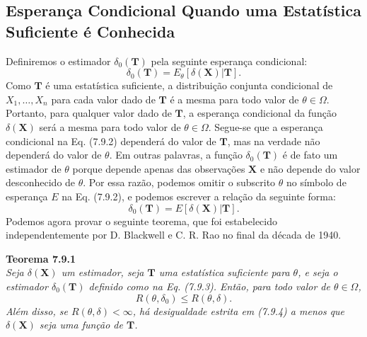 \subsection*{Esperança Condicional Quando uma Estatística Suficiente é Conhecida}

Definiremos o estimador $\delta_0(\mathbf{T})$ pela seguinte esperança condicional:
\begin{equation}
\delta_0(\mathbf{T}) = E_\theta[\delta(\mathbf{X})|\mathbf{T}]. \tag{7.9.2}
\end{equation}
Como $\mathbf{T}$ é uma estatística suficiente, a distribuição conjunta condicional de $X_1, \dots, X_n$ para cada valor dado de $\mathbf{T}$ é a mesma para todo valor de $\theta \in \Omega$. Portanto, para qualquer valor dado de $\mathbf{T}$, a esperança condicional da função $\delta(\mathbf{X})$ será a mesma para todo valor de $\theta \in \Omega$. Segue-se que a esperança condicional na Eq. (7.9.2) dependerá do valor de $\mathbf{T}$, mas na verdade não dependerá do valor de $\theta$. Em outras palavras, a função $\delta_0(\mathbf{T})$ é de fato um estimador de $\theta$ porque depende apenas das observações $\mathbf{X}$ e não depende do valor desconhecido de $\theta$. Por essa razão, podemos omitir o subscrito $\theta$ no símbolo de esperança $E$ na Eq. (7.9.2), e podemos escrever a relação da seguinte forma:
\begin{equation}
\delta_0(\mathbf{T}) = E[\delta(\mathbf{X})|\mathbf{T}]. \tag{7.9.3}
\end{equation}
Podemos agora provar o seguinte teorema, que foi estabelecido independentemente por D. Blackwell e C. R. Rao no final da década de 1940.


\noindent\textbf{Teorema 7.9.1} \\
\textit{Seja $\delta(\mathbf{X})$ um estimador, seja $\mathbf{T}$ uma estatística suficiente para $\theta$, e seja o estimador $\delta_0(\mathbf{T})$ definido como na Eq. (7.9.3). Então, para todo valor de $\theta \in \Omega$,}
\begin{equation}
    R(\theta, \delta_0) \le R(\theta, \delta). \tag{7.9.4}
\end{equation}
\textit{Além disso, se $R(\theta, \delta) < \infty$, há desigualdade estrita em (7.9.4) a menos que $\delta(\mathbf{X})$ seja uma função de $\mathbf{T}$.}

\vspace{\baselineskip}

